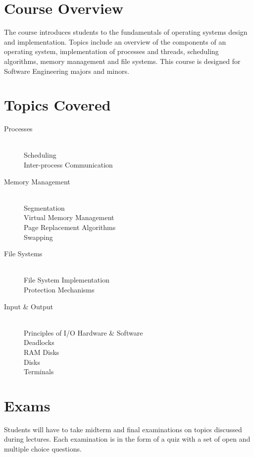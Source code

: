 \documentclass[12pt,a4paper,oneside]{article}
\begin{document}
    \section{Course Overview}

        The course introduces students to the fundamentals of operating systems
        design and implementation. Topics include an overview of the components
        of an operating system, implementation of processes and threads, scheduling
        algorithms, memory management and file systems. This course is designed
        for Software Engineering majors and minors.

    \section{Topics Covered}

        \begin{description}
            \item[Processes]\hfill\\
                Scheduling\\
                Inter-process Communication
            \item[Memory Management]\hfill\\
                Segmentation\\
                Virtual Memory Management\\
                Page Replacement Algorithms\\
                Swapping
            \item[File Systems]\hfill\\
                File System Implementation\\
                Protection Mechanisms
            \item[Input \& Output]\hfill\\
                Principles of I/O Hardware \& Software\\
                Deadlocks\\
                RAM Disks\\
                Disks\\
                Terminals
        \end{description}

    \section{Exams}

        Students will have to take midterm and final examinations on topics
        discussed during lectures. Each examination is in the form of a quiz
        with a set of open and multiple choice questions.
\end{document}
